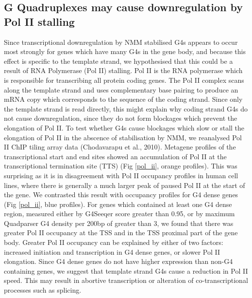 \documentclass[12pt,a4paper,]{report}
\begin{document}
\newpage

\hypertarget{g-quadruplexes-may-cause-downregulation-by-pol-ii-stalling}{%
\subsection{G Quadruplexes may cause downregulation by Pol II
stalling}\label{g-quadruplexes-may-cause-downregulation-by-pol-ii-stalling}}

Since transcriptional downregulation by NMM stabilised G4s appears to
occur most strongly for genes which have many G4s in the gene body, and
because this effect is specific to the template strand, we hypothesised
that this could be a result of RNA Polymerase (Pol II) stalling. Pol II
is the RNA polymerase which is responsible for transcribing all protein
coding genes. The Pol II complex scans along the template strand and
uses complementary base pairing to produce an mRNA copy which
corresponds to the sequence of the coding strand. Since only the
template strand is read directly, this might explain why coding strand
G4s do not cause downregulation, since they do not form blockages which
prevent the elongation of Pol II. To test whether G4s cause blockages
which slow or stall the elongation of Pol II in the abscence of
stabilisation by NMM, we reanalysed Pol II ChIP tiling array data
(Chodavarapu et al., 2010). Metagene profiles of the transcriptional
start and end sites showed an accumulation of Pol II at the
transcriptional termination site (TTS) (Fig \ref{pol_ii}, orange
profiles). This was surprising as it is in disagreement with Pol II
occupancy profiles in human cell lines, where there is generally a much
larger peak of paused Pol II at the start of the gene. We contrasted
this result with occupancy profiles for G4 dense genes (Fig
\ref{pol_ii}, blue profiles). For genes which contained at least one G4
dense region, measured either by G4Seeqer score greater than 0.95, or by
maximum Quadparser G4 density per 200bp of greater than 3, we found that
there was greater Pol II occupancy at the TSS and in the TSS proximal
part of the gene body. Greater Pol II occupancy can be explained by
either of two factors: increased initiation and transcription in G4
dense genes, or slower Pol II elongation. Since G4 dense genes do not
have higher expression than non-G4 containing genes, we suggest that
template strand G4s cause a reduction in Pol II speed. This may result
in abortive transcription or alteration of co-transcriptional processes
such as splicing.

\newpage
\end{document}
